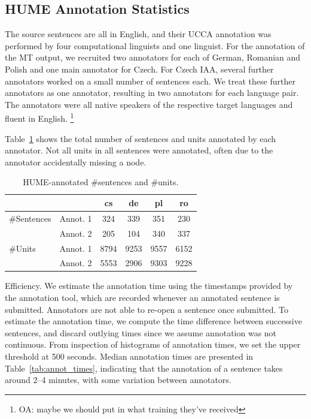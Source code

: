 \documentclass[11pt,letterpaper]{article}
\makeatletter
\renewcommand{\paragraph}{
  \@startsection{paragraph}{4}
  {\z@}{.1ex \@plus .1ex \@minus .1ex}{-1.5em}
  {\normalfont\normalsize\bfseries}
}
\newcommand{\tabref}[1]{Table~\ref{#1}}
\newcommand{\oa}[1]{\footnote{\color{red}OA: #1}}
\makeatother
\begin{document}
\subsection{HUME Annotation Statistics}
\label{sec:annot_stats}

The source sentences are all in English, and their UCCA annotation was performed by four
computational linguists and one linguist.
For the annotation of the MT output, we recruited two annotators for each of German, Romanian
and Polish and one main annotator for Czech. For Czech IAA,
several further annotators worked on a small number of 
sentences each. We treat these further annotators as one annotator, resulting in two annotators
for each language pair.
The annotators were all native speakers of the respective target languages and fluent in English.
\oa{maybe we should put in what training they've received}

\tabref{tab:annot}
shows the total number of sentences and units annotated by each annotator.
Not all units in all sentences were annotated, often due to
the annotator %
accidentally missing a node.
\begin{table}
\begin{center}
{\small
\begin{tabular}{ll|cccc}
& & cs & de & pl & ro \\
\hline
\#Sentences &  Annot. 1 & 324   & 339  & 351  & 230  \\
 & Annot. 2 & 205 & 104  & 340  & 337 \\
\hline
\#Units & Annot. 1 & 8794  & 9253 & 9557  & 6152 \\
 &Annot. 2 & 5553 & 2906  & 9303  & 9228  \\
\end{tabular}
\caption{HUME-annotated \#sentences and \#units.}
\label{tab:annot}
}
\end{center}
\end{table}

\paragraph{Efficiency.}
We estimate the annotation time using the timestamps
provided by the annotation tool, which are recorded whenever an annotated sentence is
submitted. Annotators are not able to re-open a sentence once submitted. 
To estimate the annotation time, we compute the time difference between successive 
sentences, and discard outlying times since we assume annotation was not continuous.
From inspection of histograms of annotation times, we set the upper threshold at 500 seconds.
Median annotation times are presented in Table~\ref{tab:annot_times},
indicating that the annotation
of a sentence takes around 2--4 minutes, with some variation between annotators.
\end{document}
